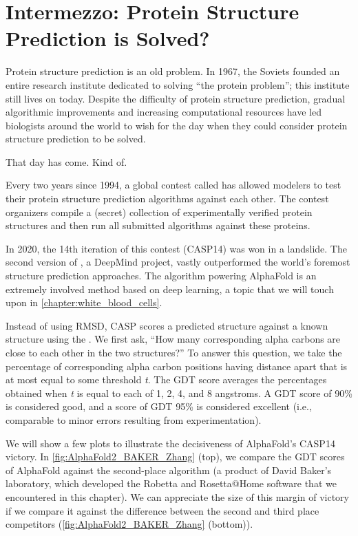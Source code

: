 \FloatBarrier
{}

\section{Intermezzo: Protein Structure Prediction is Solved?}
\label{sec:intermezzo}

Protein structure prediction is an old problem. In 1967, the Soviets founded an entire research institute dedicated to solving ``the protein problem''; this institute still lives on today. Despite the difficulty of protein structure prediction, gradual algorithmic improvements and increasing computational resources have led biologists around the world to wish for the day when they could consider protein structure prediction to be solved.

That day has come. Kind of.

Every two years since 1994, a global contest called  has allowed modelers to test their protein structure prediction algorithms against each other. The contest organizers compile a (secret) collection of experimentally verified protein structures and then run all submitted algorithms against these proteins.

In 2020, the 14th iteration of this contest (CASP14) was won in a landslide. The second version of \href{https://bit.ly/3sKl6pH}{}, a DeepMind project, vastly outperformed the world's foremost structure prediction approaches. The algorithm powering AlphaFold is an extremely involved method based on deep learning, a topic that we will touch upon in \autoref{chapter:white_blood_cells}.

Instead of using RMSD, CASP scores a predicted structure against a known structure using the . We first ask, ``How many corresponding alpha carbons are close to each other in the two structures?'' To answer this question, we take the percentage of corresponding alpha carbon positions having distance apart that is at most equal to some threshold \textit{t}. The GDT score averages the percentages obtained when \textit{t} is equal to each of 1, 2, 4, and 8 angstroms. A GDT score of 90\% is considered good, and a score of GDT 95\% is considered excellent (i.e., comparable to minor errors resulting from experimentation).

We will show a few plots to illustrate the decisiveness of AlphaFold's CASP14 victory. In \autoref{fig:AlphaFold2_BAKER_Zhang} (top), we compare the GDT scores of AlphaFold against the second-place algorithm (a product of David Baker's laboratory, which developed the Robetta and Rosetta@Home software that we encountered in this chapter). We can appreciate the size of this margin of victory if we compare it against the difference between the second and third place competitors (\autoref{fig:AlphaFold2_BAKER_Zhang} (bottom)).

